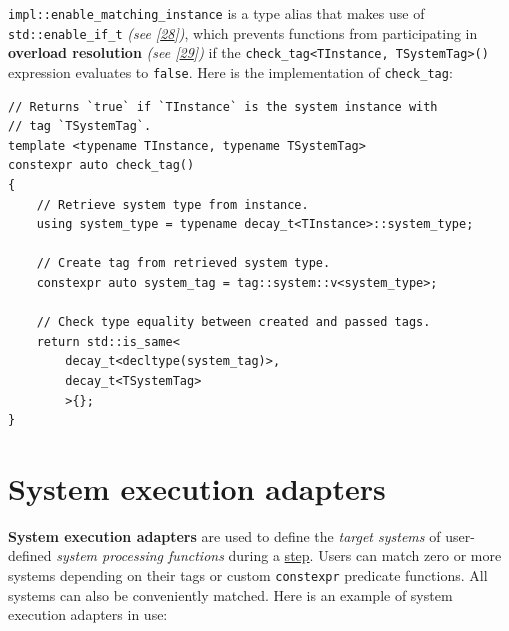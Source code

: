 \documentclass[oneside, 12pt, a4paper, openany]{book}
\begin{document}
\texttt{impl::enable_matching_instance}
is a type alias that makes use of
\texttt{std::enable_if_t}
\emph{(see {[}\protect\hyperlink{ref-cppreference_enable_if}{28}{]})},
which prevents functions from participating in \textbf{overload
resolution} \emph{(see
{[}\protect\hyperlink{ref-cppreference_overload_resolution}{29}{]})} if
the
\texttt{check_tag<TInstance, TSystemTag>()}
expression evaluates to
\texttt{false}.
Here is the implementation of
\texttt{check_tag}:

\begin{verbatim}
// Returns `true` if `TInstance` is the system instance with
// tag `TSystemTag`.
template <typename TInstance, typename TSystemTag>
constexpr auto check_tag()
{
    // Retrieve system type from instance.
    using system_type = typename decay_t<TInstance>::system_type;

    // Create tag from retrieved system type.
    constexpr auto system_tag = tag::system::v<system_type>;

    // Check type equality between created and passed tags.
    return std::is_same<
        decay_t<decltype(system_tag)>,
        decay_t<TSystemTag>
        >{};
}
\end{verbatim}

\section{System execution adapters}\label{system-execution-adapters}

\textbf{System execution adapters} are used to define the \emph{target
systems} of user-defined \emph{system processing functions} during a
\protect\hyperlink{step_stage}{step}. Users can match zero or more
systems depending on their tags or custom
\texttt{constexpr}
predicate functions. All systems can also be conveniently matched. Here
is an example of system execution adapters in use:
\end{document}
